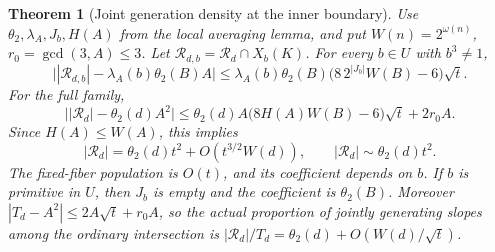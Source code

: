\documentclass[11pt]{article}
\newtheorem{theorem}{Theorem}[section]
\begin{document}
\begin{theorem}[Joint generation density at the inner boundary]
\label{thm:inner-joint-density}
Use $\theta_2,\lambda_A,J_b,H(A)$ from the local averaging lemma,
and put $W(n)=2^{\omega(n)}$, $r_0=\gcd(3,A)\le3$.
Let $\mathcal R_{d,b}=\mathcal R_d\cap X_b(K)$.
For every $b\in U$ with $b^3\ne1$,
\begin{equation}\label{eq:inner-joint-fiber}
 \bigl||\mathcal R_{d,b}|-\lambda_A(b)\theta_2(B)A\bigr|
 \le\lambda_A(b)\theta_2(B)
       \bigl(8\,2^{|J_b|}W(B)-6\bigr)\sqrt t.
\end{equation}
For the full family,
\begin{equation}\label{eq:inner-joint-total}
 \bigl||\mathcal R_d|-\theta_2(d)A^2\bigr|
 \le\theta_2(d)A\bigl(8H(A)W(B)-6\bigr)\sqrt t+2r_0A.
\end{equation}
Since $H(A)\le W(A)$, this implies
\[
 |\mathcal R_d|=\theta_2(d)t^2+O(t^{3/2}W(d)),\qquad
 |\mathcal R_d|\sim\theta_2(d)t^2.
\]
The fixed-fiber population is $O(t)$, and its coefficient depends
on $b$. If $b$ is primitive in $U$, then $J_b$ is empty and
the coefficient is $\theta_2(B)$.
Moreover $|T_d-A^2|\le2A\sqrt t+r_0A$, so the actual proportion
of jointly generating slopes among the ordinary intersection is
$|\mathcal R_d|/T_d=\theta_2(d)+O(W(d)/\sqrt t)$.
\end{theorem}
\end{document}
